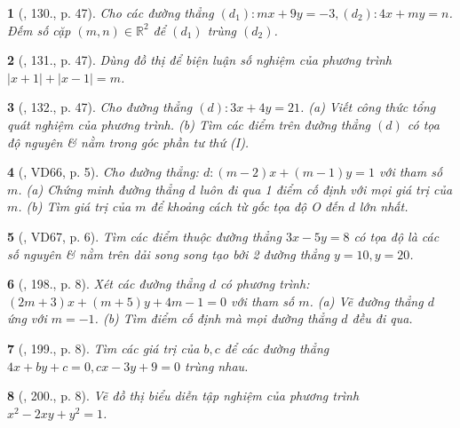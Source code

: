 \documentclass{article}
\newtheorem{baitoan}{}
\begin{document}
\begin{baitoan}[\cite{Tuyen_Toan_9_old}, 130., p. 47]
	Cho các đường thẳng $(d_1):mx + 9y = -3,(d_2):4x + my = n$. Đếm số cặp $(m,n)\in\mathbb{R}^2$ để $(d_1)$ trùng $(d_2)$.
\end{baitoan}

\begin{baitoan}[\cite{Tuyen_Toan_9_old}, 131., p. 47]
	Dùng đồ thị để biện luận số nghiệm của phương trình $|x + 1| + |x - 1| = m$.
\end{baitoan}

\begin{baitoan}[\cite{Tuyen_Toan_9_old}, 132., p. 47]
	Cho đường thẳng $(d):3x + 4y = 21$. (a) Viết công thức tổng quát nghiệm của phương trình. (b) Tìm các điểm trên đường thẳng $(d)$ có tọa độ nguyên \& nằm trong góc phần tư thứ (I).
\end{baitoan}

\begin{baitoan}[\cite{Binh_Toan_9_tap_2}, VD66, p. 5]
	Cho đường thẳng: $d:(m - 2)x + (m - 1)y = 1$ với tham số $m$. (a) Chứng minh đường thẳng $d$ luôn đi qua 1 điểm cố định với mọi giá trị của $m$. (b) Tìm giá trị của $m$ để khoảng cách từ gốc tọa độ O đến $d$ lớn nhất.
\end{baitoan}

\begin{baitoan}[\cite{Binh_Toan_9_tap_2}, VD67, p. 6]
	Tìm các điểm thuộc đường thẳng $3x - 5y = 8$ có tọa độ là các số nguyên \& nằm trên dải song song tạo bởi 2 đường thẳng $y = 10,y = 20$.
\end{baitoan}

\begin{baitoan}[\cite{Binh_Toan_9_tap_2}, 198., p. 8]
	Xét các đường thẳng $d$ có phương trình: $(2m + 3)x + (m + 5)y + 4m - 1 = 0$ với tham số $m$. (a) Vẽ đường thẳng $d$ ứng với $m = -1$. (b) Tìm điểm cố định mà mọi đường thẳng $d$ đều đi qua.
\end{baitoan}

\begin{baitoan}[\cite{Binh_Toan_9_tap_2}, 199., p. 8]
	Tìm các giá trị của $b,c$ để các đường thẳng $4x + by + c = 0,cx - 3y + 9 = 0$ trùng nhau.
\end{baitoan}

\begin{baitoan}[\cite{Binh_Toan_9_tap_2}, 200., p. 8]
	Vẽ đồ thị biểu diễn tập nghiệm của phương trình $x^2 - 2xy + y^2 = 1$.
\end{baitoan}
\end{document}
